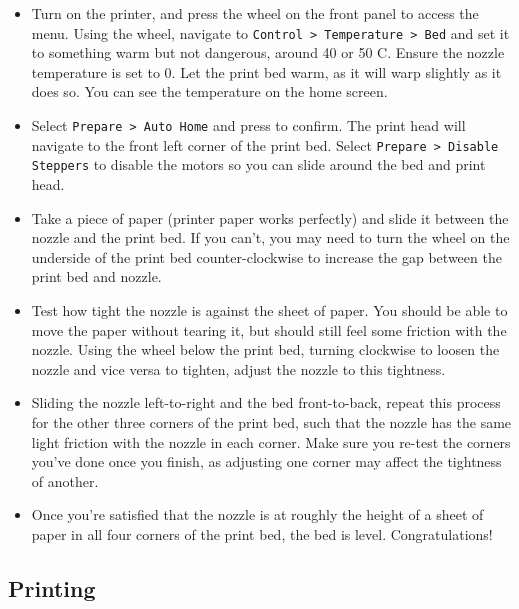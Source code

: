 \documentclass[12pt]{report}
\begin{document}
\begin{itemize}
    \item Turn on the printer, and press the wheel on the front panel to access
        the menu. Using the wheel, navigate to \texttt{Control > Temperature >
        Bed} and set it to something warm but not dangerous, around 40 or 50
        \textdegree C. Ensure the nozzle temperature is set to 0. Let the
        print bed warm, as it will warp slightly as it does so. You can see the
        temperature on the home screen.
    \item Select \texttt{Prepare > Auto Home} and press to confirm. The print
        head will navigate to the front left corner of the print bed. Select
        \texttt{Prepare > Disable Steppers} to disable the motors so you can
        slide around the bed and print head.
    \item Take a piece of paper (printer paper works perfectly) and slide it
        between the nozzle and the print bed. If you can't, you may need to turn
        the wheel on the underside of the print bed counter-clockwise to
        increase the gap between the print bed and nozzle.
    \item Test how tight the nozzle is against the sheet of paper. You should be
        able to move the paper without tearing it, but should still feel some
        friction with the nozzle. Using the wheel below the print bed, turning
        clockwise to loosen the nozzle and vice versa to tighten, adjust the
        nozzle to this tightness.
    \item Sliding the nozzle left-to-right and the bed front-to-back, repeat
        this process for the other three corners of the print bed, such that
        the nozzle has the same light friction with the nozzle in each corner.
        Make sure you re-test the corners you've done once you finish, as
        adjusting one corner may affect the tightness of another.
   \item Once you're satisfied that the nozzle is at roughly the height of a
        sheet of paper in all four corners of the print bed, the bed is level.
        Congratulations!
\end{itemize}

\pagebreak
\subsection*{Printing}
\label{sec:printing}
\end{document}
